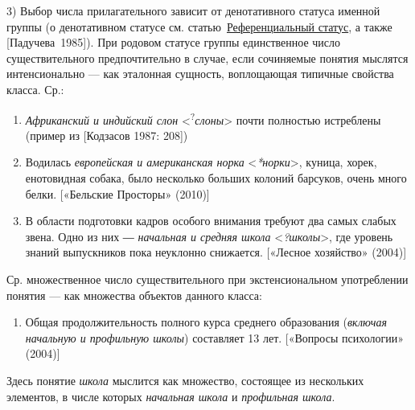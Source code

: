 3) Выбор числа прилагательного зависит от денотативного статуса именной
группы (о денотативном статусе см. статью~\underline{Референциальный
  статус}, а также {[}Падучева~1985{]}). При родовом статусе группы
единственное число существительного предпочтительно в случае, если
сочиняемые понятия мыслятся интенсионально --- как эталонная сущность,
воплощающая типичные свойства класса. Ср.:

\begin{enumerate}
  \def\labelenumi{(\arabic{enumi})}
  \setcounter{enumi}{145}
  \item
        \textit{Африканский и индийский слон}
        \textless{}\textsuperscript{?}\textit{слоны}\textgreater{} почти
        полностью истреблены (пример из {[}Кодзасов 1987: 208{]})
  \item
        Водилась \textit{европейская и американская норка}
        \textless{}\textit{*норки}\textgreater, куница, хорек, енотовидная
        собака, было несколько больших колоний барсуков, очень много белки.
        {[}«Бельские Просторы» (2010){]}
  \item
        В области подготовки кадров особого внимания требуют два самых слабых
        звена. Одно из них ― \textit{начальная и средняя школа}
        \textless{}\textit{?школы}\textgreater, где уровень знаний выпускников
        пока неуклонно снижается. {[}«Лесное хозяйство» (2004){]}
\end{enumerate}

Ср. множественное число существительного при экстенсиональном
употреблении понятия --- как множества объектов данного класса:

\begin{enumerate}
  \def\labelenumi{(\arabic{enumi})}
  \setcounter{enumi}{148}
  \item
        Общая продолжительность полного курса среднего образования
        (\textit{включая начальную и профильную школы}) составляет 13 лет.
        {[}«Вопросы психологии» (2004){]}
\end{enumerate}

Здесь понятие \textit{школа} мыслится как множество, состоящее из
нескольких элементов, в числе которых \textit{начальная школа} и
\textit{профильная школа}.

